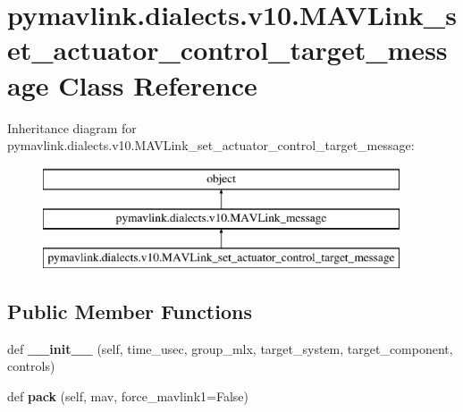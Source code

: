 \hypertarget{classpymavlink_1_1dialects_1_1v10_1_1MAVLink__set__actuator__control__target__message}{}\section{pymavlink.\+dialects.\+v10.\+M\+A\+V\+Link\+\_\+set\+\_\+actuator\+\_\+control\+\_\+target\+\_\+message Class Reference}
\label{classpymavlink_1_1dialects_1_1v10_1_1MAVLink__set__actuator__control__target__message}
Inheritance diagram for pymavlink.\+dialects.\+v10.\+M\+A\+V\+Link\+\_\+set\+\_\+actuator\+\_\+control\+\_\+target\+\_\+message\+:\begin{figure}[H]
\begin{center}
\leavevmode
\includegraphics[height=3.000000cm]{classpymavlink_1_1dialects_1_1v10_1_1MAVLink__set__actuator__control__target__message}
\end{center}
\end{figure}
\subsection*{Public Member Functions}
\begin{DoxyCompactItemize}
\item 
\mbox{\label{classpymavlink_1_1dialects_1_1v10_1_1MAVLink__set__actuator__control__target__message_a908d4527931e7b07f7aad158d19953ee}} 
def {\bfseries \+\_\+\+\_\+init\+\_\+\+\_\+} (self, time\+\_\+usec, group\+\_\+mlx, target\+\_\+system, target\+\_\+component, controls)
\item 
\mbox{\label{classpymavlink_1_1dialects_1_1v10_1_1MAVLink__set__actuator__control__target__message_a494839b2baa6c30db2e2974d74756cd2}} 
def {\bfseries pack} (self, mav, force\+\_\+mavlink1=False)
\end{DoxyCompactItemize}
